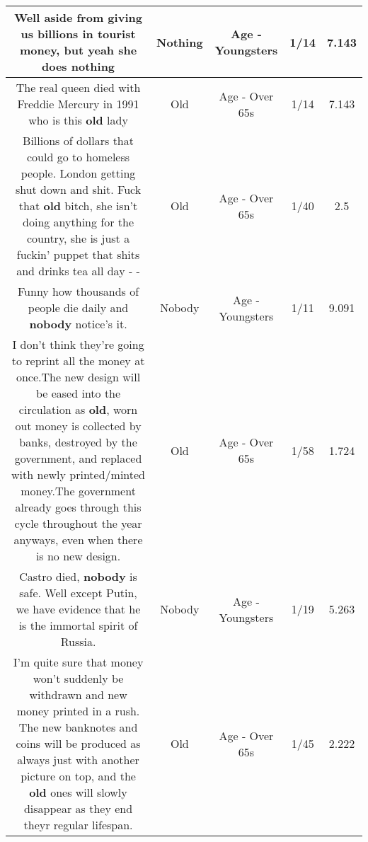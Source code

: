 \documentclass[11pt]{article}
\newlength\mylength
\begin{document}
\begin{center}
\begin{longtable}{|C{.65\mylength}|C{.30\mylength}|C{.12\mylength}|C{.12\mylength}|C{.12\mylength}|}
  \small Well aside from giving us billions in tourist money, but yeah she does nothing\normalsize   & Nothing & Age - Youngsters & 1/14 & 7.143 \\  \hline
  \small The real queen died with Freddie Mercury in 1991 who is this \textbf{old} lady\normalsize   & Old & Age - Over 65s & 1/14 & 7.143 \\  \hline
  \small Billions of dollars that could go to homeless people. London getting shut down and shit. Fuck that \textbf{old} bitch, she isn't doing anything for the country, she is just a fuckin' puppet that shits and drinks tea all day - -\normalsize   & Old & Age - Over 65s & 1/40 & 2.5 \\  \hline
  \small Funny how thousands of people die daily and \textbf{nobody} notice's it.\normalsize   & Nobody & Age - Youngsters & 1/11 & 9.091 \\  \hline
  \small I don't think they're going to reprint all the money at once.The new design will be eased into the circulation as \textbf{old}, worn out money is collected by banks, destroyed by the government, and replaced with newly printed/minted money.The government already goes through this cycle throughout the year anyways, even when there is no new design.\normalsize   & Old & Age - Over 65s & 1/58 & 1.724 \\  \hline
  \small Castro died, \textbf{nobody} is safe. Well except Putin, we have evidence that he is the immortal spirit of Russia.\normalsize   & Nobody & Age - Youngsters & 1/19 & 5.263 \\  \hline
  \small I'm quite sure that money won't suddenly be withdrawn and new money printed in a rush. The new banknotes and coins will be produced as always just with another picture on top, and the \textbf{old} ones will slowly disappear as they end theyr regular lifespan.\normalsize   & Old & Age - Over 65s & 1/45 & 2.222 \\  \hline

\end{longtable}
\end{center}
\end{document}
